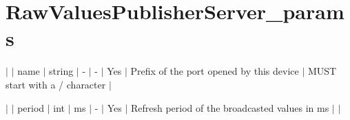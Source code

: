\chapter{Raw\+Values\+Publisher\+Server\+\_\+params }
\hypertarget{md_icub-main_2src_2libraries_2icubmod_2rawValuesPublisherServer_2RawValuesPublisherServer__params}{}\label{md_icub-main_2src_2libraries_2icubmod_2rawValuesPublisherServer_2RawValuesPublisherServer__params}

\begin{DoxyItemize}
\item \texorpdfstring{$\vert$}{|} \texorpdfstring{$\vert$}{|} name \texorpdfstring{$\vert$}{|} string \texorpdfstring{$\vert$}{|} -\/ \texorpdfstring{$\vert$}{|} -\/ \texorpdfstring{$\vert$}{|} Yes \texorpdfstring{$\vert$}{|} Prefix of the port opened by this device \texorpdfstring{$\vert$}{|} MUST start with a \textquotesingle{}/\textquotesingle{} character \texorpdfstring{$\vert$}{|}
\item \texorpdfstring{$\vert$}{|} \texorpdfstring{$\vert$}{|} period \texorpdfstring{$\vert$}{|} int \texorpdfstring{$\vert$}{|} ms \texorpdfstring{$\vert$}{|} -\/ \texorpdfstring{$\vert$}{|} Yes \texorpdfstring{$\vert$}{|} Refresh period of the broadcasted values in ms \texorpdfstring{$\vert$}{|} \texorpdfstring{$\vert$}{|} 
\end{DoxyItemize}